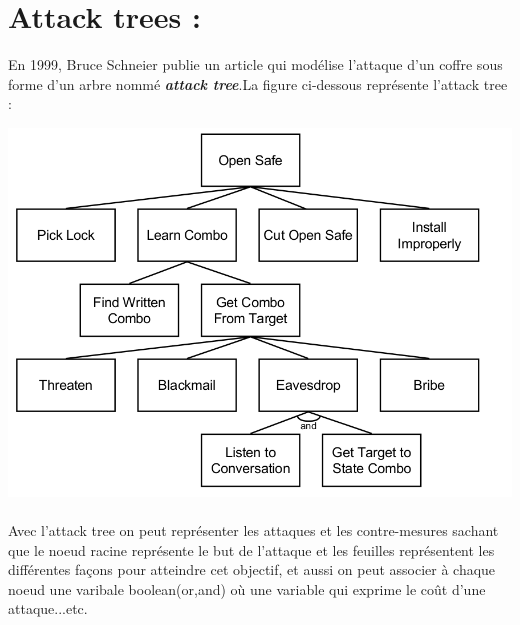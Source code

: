 \documentclass[10pt,a4paper]{article}
\author{}
\date{}
\begin{document}
\section{Attack trees :}
En 1999, Bruce Schneier publie un article \cite{ref4} qui modélise l'attaque d'un coffre sous forme d'un arbre nommé \textbf{\textit{attack tree}}.La figure ci-dessous représente l'attack tree : 
\begin{center}
\includegraphics[scale=0.3]{img/tree.png}
\end{center}
\paragraph{}
Avec l'attack tree on peut représenter les attaques et les contre-mesures sachant que le noeud racine représente le but de l'attaque et les feuilles  représentent les différentes façons pour atteindre cet objectif, et aussi on peut associer à chaque noeud une varibale boolean(or,and) où une variable qui exprime le coût d'une attaque...etc.
\end{document}
